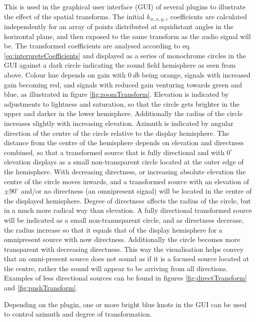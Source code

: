 \documentclass{article}
\begin{document}
This is used in the graphical user interface (GUI) of several plugins to illustrate the effect of the spatial transforms. 
The initial $k_{w, x, y, z}$ coefficients are calculated independently for an array of points distributed at equidistant angles in the horizontal plane, and then exposed to the same transform as the audio signal will be. 
The transformed coefficients are analysed according to eq. \ref{eq:interpreteCoefficients} and displayed as a series of monochrome circles in the GUI against a dark circle indicating the sound field hemisphere as seen from above.
Colour hue depends on gain with $0\: db$ being orange, signals with increased gain becoming red, and signals with reduced gain venturing towards green and blue, as illustrated in figure \ref{fig:zoomTransform}.
Elevation is indicated by adjustments to lightness and saturation, so that the circle gets brighter in the upper and darker in the lower hemisphere.
Additionally the radius of the circle increases slightly with increasing elevation.
Azimuth is indicated by angular direction of the centre of the circle relative to the display hemisphere.
The distance from the centre of the hemisphere depends on elevation and directness combined, so that a transformed source that is fully directional and with $0^{\circ}$ elevation displays as a small non-transparent circle located at the outer edge of the hemisphere.
With decreasing directness, or increasing absolute elevation the centre of the circle moves inwards, and a transformed source with an elevation of $\pm 90^{\circ}$ and/or no directness (an omnipresent signal) will be located in the centre of the displayed hemisphere.
Degree of directness affects the radius of the circle, but in a much more radical way than elevation. A fully directional transformed source will be indicated as a small non-trannsparent circle, and as directness decrease, the radius increase so that it equals that of the display hemisphere for a omnipresent source with now directness.
Additionally the circle becomes more transparent with decreasing directness.
This way the visualisation helps convey that an omni-present source does not sound as if it is a focused source located at the centre, rather the sound will appear to be arriving from all directions.
Examples of less directional sources can be found in figures \ref{fig:directTransform} and \ref{fig:pushTransform}.

Depending on the plugin, one or more bright blue knots in the GUI can be used to control azimuth and degree of transformation.
\end{document}
